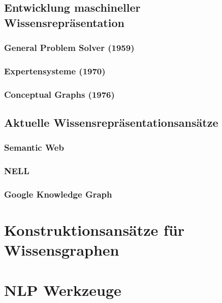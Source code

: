 \subsection{Entwicklung maschineller Wissensrepräsentation}
\label{sec:related:kr:history}

\subsubsection{General Problem Solver (1959)}
\label{sec:related:kr:history:gps}

\subsubsection{Expertensysteme (1970)}
\label{sec:related:kr:history:expert}

\subsubsection{Conceptual Graphs (1976)}
\label{sec:related:kr:history:cg}

\subsection{Aktuelle Wissensrepräsentationsansätze}
\label{sec:related:kr:today}

\subsubsection{Semantic Web}
\label{sec:related:kr:today:sw}

\subsubsection{NELL}
\label{sec:related:kr:today:nell}

\subsubsection{Google Knowledge Graph}
\label{sec:related:kr:today:google-kg}

\section{Konstruktionsansätze für Wissensgraphen}
\label{sec:related:kbc}

\section{NLP Werkzeuge}
\label{sec:related:nlp}
